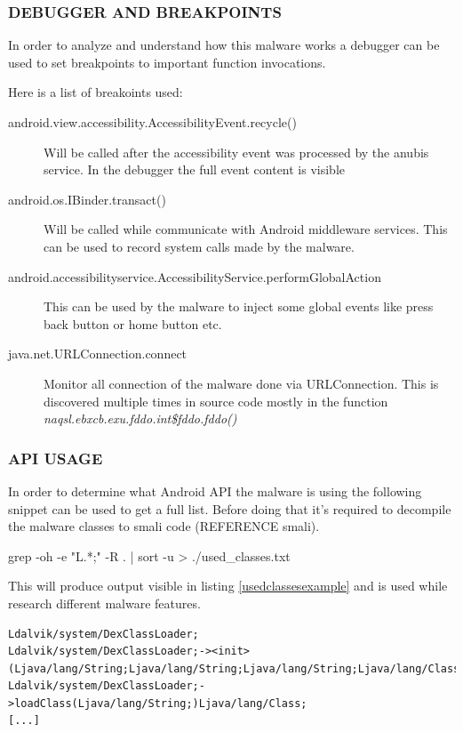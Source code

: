 \documentclass[10pt,titlepage]{article}
\begin{document}
\subsubsection{DEBUGGER AND BREAKPOINTS}
In order to analyze and understand how this malware works a debugger can be used to set breakpoints to important function invocations.

Here is a list of breakoints used:

\begin{description}
\item[android.view.accessibility.AccessibilityEvent.recycle()] Will be called after the accessibility event was processed by the anubis service. In the debugger the full event content is visible
\item[android.os.IBinder.transact()] Will be called while communicate with Android middleware services. This can be used to record system calls made by the malware.
\item[android.accessibilityservice.AccessibilityService.performGlobalAction] This can be used by the malware to inject some global events like press back button or home button etc.
\item[java.net.URLConnection.connect] Monitor all connection of the malware done via URLConnection. This is discovered multiple times in source code mostly in the function \textit{naqsl.ebxcb.exu.fddo.int\$fddo.fddo()}
\end{description}

\subsubsection{API USAGE}
In order to determine what Android API the malware is using the following snippet can be used to get a full list. Before doing that it's required to decompile the malware classes to smali code (REFERENCE smali).

\begin{spverbatim}
grep -oh -e "L.*;"  -R . | sort -u > ./used_classes.txt
\end{spverbatim}

This will produce output visible in listing \ref{usedclassesexample} and is used while research different malware features.

\begin{lstlisting}[label=usedclassesexample,caption=Example output of the API usage script..,frame=tb]
Ldalvik/system/DexClassLoader;
Ldalvik/system/DexClassLoader;-><init>(Ljava/lang/String;Ljava/lang/String;Ljava/lang/String;Ljava/lang/ClassLoader;
Ldalvik/system/DexClassLoader;->loadClass(Ljava/lang/String;)Ljava/lang/Class;
[...]
\end{lstlisting}
\end{document}
